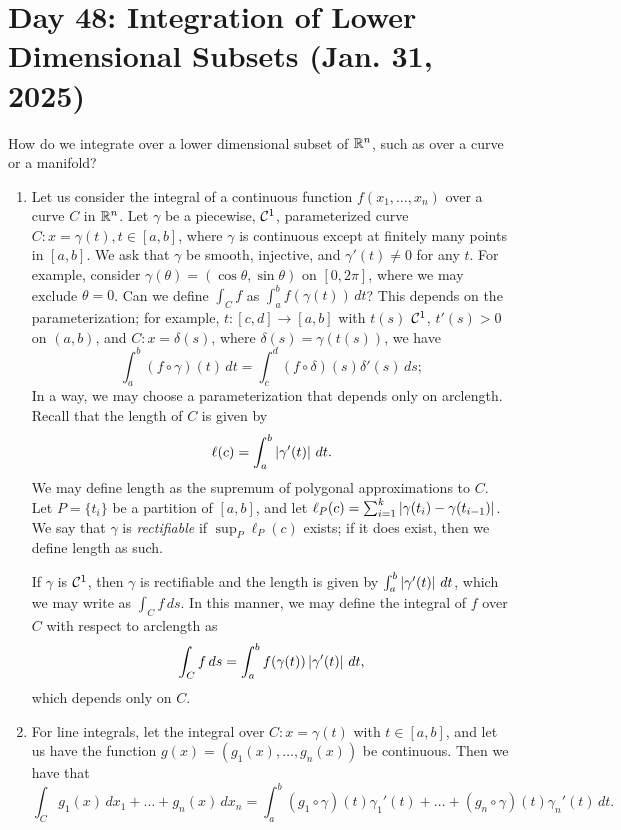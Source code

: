 \section{Day 48: Integration of Lower Dimensional Subsets (Jan. 31, 2025)}
How do we integrate over a lower dimensional subset of $\mathbb R^n$, such as over a curve or a manifold?
\begin{enumerate}[label=(\roman*)]
    \item Let us consider the integral of a continuous function $f(x_1, \dots, x_n)$ over a curve $C$ in $\mathbb R^n$. Let $\gamma$ be a piecewise, $\mathcal C^1$, parameterized curve $C : x = \gamma(t), t \in [a, b]$, where $\gamma$ is continuous except at finitely many points in $[a, b]$. We ask that $\gamma$ be smooth, injective, and $\gamma'(t) \neq 0$ for any $t$. For example, consider $\gamma(\theta) = (\cos \theta, \sin \theta)$ on $[0, 2\pi]$, where we may exclude $\theta = 0$. Can we define $\int_C f$ as $\int_a^b f(\gamma(t)) \, dt$? This depends on the parameterization; for example, $t : [c, d] \to [a, b]$ with $t(s)$ $\mathcal C^1$, $t'(s) > 0$ on $(a, b)$, and $C : x = \delta(s)$, where $\delta(s) = \gamma(t(s))$, we have
    \[ \int_a^b (f \circ \gamma)(t) \, dt = \int_c^d (f \circ \delta)(s) \delta'(s) \, ds; \]
    In a way, we may choose a parameterization that depends only on arclength. Recall that the length of $C$ is given by
    \[ \ell(c) = \int_a^b \left\lvert \gamma'(t) \right\rvert \, dt. \]
    We may define length as the supremum of polygonal approximations to $C$. Let $P = \{t_i\}$ be a partition of $[a, b]$, and let $\ell_P (c) = \sum_{i=1}^k \left\lvert \gamma(t_i) - \gamma(t_{i-1}) \right\rvert$. We say that $\gamma$ is \textit{rectifiable} if $\sup_P \ell_P(c)$ exists; if it does exist, then we define length as such.
    \begin{exercise}
        If $\gamma$ is $\mathcal C^1$, then $\gamma$ is rectifiable and the length is given by $\int_a^b \left\lvert \gamma'(t) \right\rvert \, dt$, which we may write as $\int_C f \, ds$. In this manner, we may define the integral of $f$ over $C$ with respect to arclength as
        \[ \int_C f \, ds = \int_a^b f(\gamma(t)) \left\lvert \gamma'(t) \right\rvert \, dt, \]
        which depends only on $C$.
    \end{exercise}
    \item For line integrals, let the integral over $C : x = \gamma(t)$ with $t \in [a, b]$, and let us have the function $g(x) = (g_1(x), \dots, g_n(x))$ be continuous. Then we have that
    \[ \int_C g_1(x) \, dx_1 + \dots + g_n(x) \, dx_n = \int_a^b (g_1 \circ \gamma)(t)\gamma_1'(t) + \dots + (g_n \circ \gamma)(t) \gamma_n'(t) \, dt. \]

\end{enumerate}
